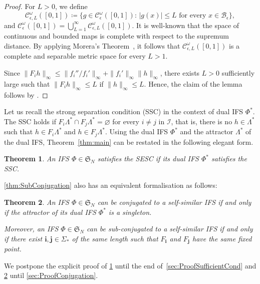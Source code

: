 \documentclass[11pt,a4paper]{article}
\def\cref#1{\ref{#1}}%
\newtheorem{theorem}{Theorem}[section]
\theoremstyle{definition}
\theoremstyle{remark}
\newcommand{\0}{\mathbf{0}}
\newcommand{\bi}{\mathbf{i}}
\newcommand{\bj}{\mathbf{j}}
\numberwithin{equation}{section}
\begin{document}
\begin{proof}
For $L>0$, we define 
$$
\mathcal{C}_{\epsilon,L}^{\omega}([0,1])\coloneqq \big\{g\in\mathcal{C}_\epsilon^{\omega}([0,1]):\,
|g(x)|\leq L\text{ for every }x\in\mathcal{B}_\epsilon\big\},
$$
and
$\mathcal{C}_{\epsilon}^{\omega}([0,1])=\bigcup_{L=1}^\infty\mathcal{C}_{\epsilon,L}^{\omega}([0,1])$.
It is well-known that the space of continuous and bounded maps is complete with respect to the
supremum distance. By applying Morera's Theorem~\cite[Theorem 10.17]{Rudin_AnalysisBook}, it follows
that $\mathcal{C}_{\epsilon,L}^{\omega}([0,1])$ is a complete and separable metric space for every
$L>1$.	
	
Since $\|F_ih\|_\infty\leq\|f_i'' / f_i'\|_\infty+\|f_i'\|_\infty\|h\|_\infty$, there exists $L>0$
sufficiently large such that $\|F_ih\|_\infty\leq L$ if $\|h\|_\infty\leq L$. Hence, the claim of
the lemma follows by \cite{Hutchinson_Attractor_81}.
\end{proof}
Let us recall the strong separation condition (SSC) in the context of dual IFS $\Phi^*$. The SSC
holds if $F_i\Lambda^*\cap F_j\Lambda^*=\varnothing$ for every $i\neq j$ in $\mathcal{I}$, that is,
there is no $h\in\Lambda^*$ such that $h\in F_i\Lambda^*$ and $h\in F_j\Lambda^*$.
Using the dual IFS $\Phi^*$ and the attractor $\Lambda^*$ of the dual IFS, Theorem~\ref{thm:main}
can be restated in the following elegant form.
\begin{theorem}\label{thm:DualSSC}
	An IFS $\Phi\in\mathfrak{S}_N$ satisfies the SESC if its dual IFS $\Phi^*$ satisfies the SSC.
\end{theorem}

\cref{thm:SubConjugation} also has an equivalent formalisation as follows:

\begin{theorem}\label{thm:DualConj}
	An IFS $\Phi\in\mathfrak{S}_N$ can be conjugated to a self-similar IFS if and only if the
	attractor of its dual IFS $\Phi^*$ is a singleton. 
	
	Moreover, an IFS $\Phi\in\mathfrak{S}_N$ can be sub-conjugated to a self-similar IFS if and
	only if there exist
	$\bi,\bj\in\Sigma_*$ of the same length such that $F_{\bi}$ and $F_{\bj}$ have the same
	fixed point.
\end{theorem}

We postpone the explicit proof of \cref{thm:DualSSC} until the end of~\cref{sec:ProofSufficientCond} and
\cref{thm:DualConj} until \cref{sec:ProofConjugation}.
\end{document}
